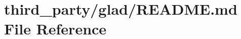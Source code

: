 \hypertarget{third__party_2glad_2README_8md}{}\section{third\+\_\+party/glad/\+R\+E\+A\+D\+ME.md File Reference}
\label{third__party_2glad_2README_8md}

